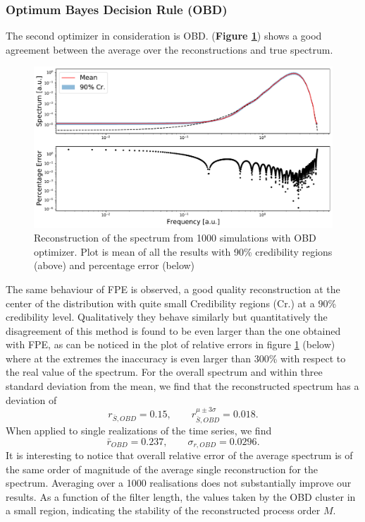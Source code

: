 \documentclass[twocolumn,showpacs,preprintnumbers,nofootinbib,prd,
superscriptaddress,10pt]{revtex4-1}
\begin{document}
\subsubsection{Optimum Bayes Decision Rule (OBD)}
The second optimizer in consideration is OBD.  (\textbf{Figure \ref{fig:OBD3000}}) shows a good agreement between the average over the reconstructions and true spectrum.
\begin{figure}[H]
    \centering
    \includegraphics[width = \linewidth]{Images/NormalPSD/OBDpsdAndResiduals.pdf}
    \caption{Reconstruction of the spectrum from 1000 simulations with OBD optimizer. Plot is mean of all the results with 90\% credibility regions (above) and percentage error (below)}
    \label{fig:OBD3000}
\end{figure}
The same behaviour of FPE is observed, a good quality reconstruction at the center of the distribution with quite small Credibility regions (Cr.) at a $90$\% credibility level.
Qualitatively they behave similarly but quantitatively the disagreement of this method is found to be even larger than the one obtained with FPE, as can be noticed in the plot of relative errors in figure \ref{fig:OBD3000} (below) where at the extremes the inaccuracy is even larger than 300\% with respect to the real value of the spectrum. For the overall spectrum and within three standard deviation from the mean, we find that the reconstructed spectrum has a deviation of
\begin{equation}
    \nonumber
    r_{\bar S, OBD} = 0.15, \qquad r^{\mu \pm 3\sigma}_{\bar S, OBD} = 0.018. 
\end{equation}
When applied to single realizations of the time series, we find
\begin{equation}
    \nonumber
    \bar{r}_{OBD} = 0.237, \qquad \sigma_{r, OBD} = 0.0296.
\end{equation}
It is interesting to notice that overall relative error of the average spectrum is of the same order of magnitude of the average single reconstruction for the spectrum. Averaging over a 1000 realisations does not substantially improve our results. As a function of the filter length, the values taken by the OBD cluster in a small region, indicating the stability of the reconstructed process order $M$.
\end{document}
